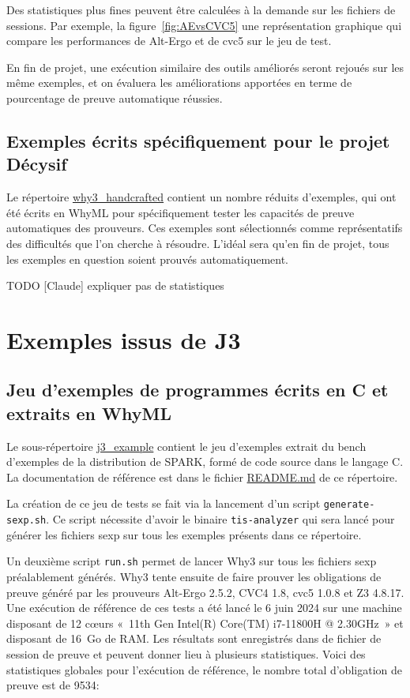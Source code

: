 \documentclass[a4paper,11pt]{article}
\begin{document}
Des statistiques plus fines peuvent être calculées à la demande sur
les fichiers de sessions. Par exemple, la figure~\ref{fig:AEvsCVC5}
une représentation graphique qui compare les performances de Alt-Ergo
et de cvc5 sur le jeu de test.

En fin de projet, une exécution similaire des outils améliorés seront
rejoués sur les même exemples, et on évaluera les améliorations
apportées en terme de pourcentage de preuve automatique réussies.

\subsection{Exemples écrits spécifiquement pour le projet Décysif}

Le répertoire \url{why3_handcrafted} contient un nombre réduits
d'exemples, qui ont été écrits en WhyML pour spécifiquement tester les
capacités de preuve automatiques des prouveurs. Ces exemples sont
sélectionnés comme représentatifs des difficultés que l'on cherche à
résoudre. L'idéal sera qu'en fin de projet, tous les exemples en
question soient prouvés automatiquement.

TODO [Claude] expliquer pas de statistiques

\section{Exemples issus de J3}

\subsection{Jeu d'exemples de programmes écrits en C et extraits en WhyML}

Le sous-répertoire \url{j3_example} contient le jeu d'exemples extrait du bench
d'exemples de la distribution de SPARK, formé de code source dans le langage C.
La documentation de référence est dans le fichier \url{README.md} de ce
répertoire.

La création de ce jeu de tests se fait via la lancement d'un script
\verb/generate-sexp.sh/.
Ce script nécessite d'avoir le binaire \verb/tis-analyzer/ qui sera lancé
pour générer les fichiers sexp sur tous les exemples présents dans ce
répertoire.

Un deuxième script \verb/run.sh/ permet de lancer Why3 sur tous les fichiers
sexp préalablement générés. Why3 tente ensuite de faire prouver les obligations
de preuve généré par les prouveurs Alt-Ergo 2.5.2, CVC4 1.8, cvc5 1.0.8 et
Z3 4.8.17. Une exécution de référence de ces tests a été lancé le 6 juin 2024
sur une machine disposant de 12 c{\oe}urs «~11th Gen Intel(R) Core(TM) i7-11800H @ 2.30GHz~» et disposant de 16~Go de RAM.
Les résultats sont enregistrés dans de fichier de session de preuve et peuvent
donner lieu à plusieurs statistiques.
Voici des statistiques globales pour l'exécution de
référence, le nombre total d'obligation de preuve est de 9534:
\end{document}
